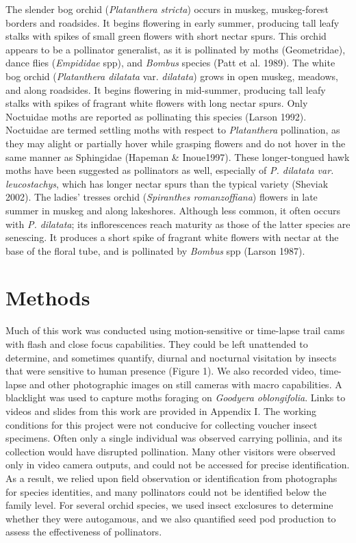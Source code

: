 \begin{multicols}{2}
The slender bog orchid (\emph{Platanthera stricta}) occurs in muskeg,
muskeg-forest borders and roadsides. It begins flowering in early
summer, producing tall leafy stalks with spikes of small green flowers
with short nectar spurs. This orchid appears to be a pollinator
generalist, as it is pollinated by moths (Geometridae), dance flies
(\emph{Empididae} spp), and \emph{Bombus} species (Patt et al. 1989).
The white bog orchid (\emph{Platanthera dilatata} var. \emph{dilatata})
grows in open muskeg, meadows, and along roadsides. It begins flowering
in mid-summer, producing tall leafy stalks with spikes of fragrant white
flowers with long nectar spurs. Only Noctuidae moths are reported as
pollinating this species (Larson 1992). Noctuidae are termed settling
moths with respect to \emph{Platanthera} pollination, as they may alight
or partially hover while grasping flowers and do not hover in the same
manner as Sphingidae (Hapeman \& Inoue1997). These longer-tongued hawk
moths have been suggested as pollinators as well, especially of \emph{P.
dilatata var. leucostachys}, which has longer nectar spurs than the
typical variety (Sheviak 2002). The ladies' tresses orchid
(\emph{Spiranthes romanzoffiana}) flowers in late summer in muskeg and
along lakeshores. Although less common, it often occurs with \emph{P.
dilatata}; its inflorescences reach maturity as those of the latter
species are senescing. It produces a short spike of fragrant white
flowers with nectar at the base of the floral tube, and is pollinated by
\emph{Bombus} spp (Larson 1987).

\section{Methods}

Much of this work was conducted using motion-sensitive or time-lapse
trail cams with flash and close focus capabilities. They could be left
unattended to determine, and sometimes quantify, diurnal and nocturnal
visitation by insects that were sensitive to human presence (Figure 1).
We also recorded video, time-lapse and other photographic images on
still cameras with macro capabilities. A blacklight was used to capture
moths foraging on \emph{Goodyera oblongifolia}. Links to videos and
slides from this work are provided in Appendix I. The working conditions
for this project were not conducive for collecting voucher insect
specimens. Often only a single individual was observed carrying
pollinia, and its collection would have disrupted pollination. Many
other visitors were observed only in video camera outputs, and could not
be accessed for precise identification. As a result, we relied upon
field observation or identification from photographs for species
identities, and many pollinators could not be identified below the
family level. For several orchid species, we used insect exclosures to
determine whether they were autogamous, and we also quantified seed pod
production to assess the effectiveness of pollinators.


\end{multicols}
